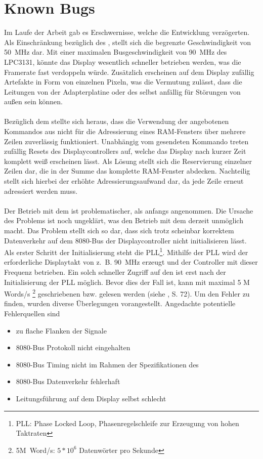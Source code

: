 \section{Known Bugs}
\label{teila_knownbugs}
Im Laufe der Arbeit gab es Erschwernisse, welche die Entwicklung verzögerten. 
Als Einschränkung bezüglich des , stellt sich die begrenzte Geschwindigkeit von 50~MHz dar. Mit einer maximalen Busgeschwindigkeit von 90~MHz des LPC3131, könnte das Display wesentlich schneller betrieben werden, was die Framerate fast verdoppeln würde. Zusätzlich erscheinen auf dem Display zufällig Artefakte in Form von einzelnen Pixeln, was die Vermutung zulässt, dass die Leitungen von der Adapterplatine oder des  selbst anfällig für Störungen von außen sein können. \\ \\
Bezüglich dem  stellte sich heraus, dass die Verwendung der angebotenen Kommandos aus  nicht für die Adressierung eines RAM-Fensters über mehrere Zeilen zuverlässig funktioniert. Unabhängig vom gesendeten Kommando treten zufällig Resets des Displaycontrollers auf, welche das Display nach kurzer Zeit komplett weiß erscheinen lässt. Als Lösung stellt sich die Reservierung einzelner Zeilen dar, die in der Summe das komplette RAM-Fenster abdecken. Nachteilig stellt sich hierbei der erhöhte Adressierungsaufwand dar, da jede Zeile erneut adressiert werden muss.\\ \\
Der Betrieb mit dem  ist problematischer, als anfangs angenommen. Die Ursache des Problems ist noch ungeklärt, was den Betrieb mit dem  derzeit unmöglich macht.
Das Problem stellt sich so dar, dass sich trotz scheinbar korrektem Datenverkehr auf dem 8080-Bus der Displaycontroller nicht initialisieren lässt. Als erster Schritt der Initialisierung steht die PLL\footnote{PLL: Phase Locked Loop, Phasenregelschleife zur Erzeugung von hohen Taktraten}. Mithilfe der PLL wird der erforderliche Displaytakt von z.~B. 90~MHz erzeugt und der Controller mit dieser Frequenz betrieben. Ein solch schneller Zugriff auf den  ist erst nach der Initialisierung der PLL möglich. Bevor dies der Fall ist, kann mit maximal 5 M Words/s \footnote{5M~Word/s: $5*10^6$ Datenwörter pro Sekunde} geschriebenen bzw. gelesen werden (siehe \cite{SSD2008}, S. 72). Um den Fehler zu finden, wurden diverse Überlegungen vorangestellt. Angedachte potentielle Fehlerquellen sind
\begin{itemize}
\item zu flache Flanken der Signale
\item 8080-Bus Protokoll nicht eingehalten
\item 8080-Bus Timing nicht im Rahmen der Spezifikationen des 
\item 8080-Bus Datenverkehr fehlerhaft
\item Leitungsführung auf dem Display selbst schlecht
\end{itemize}
